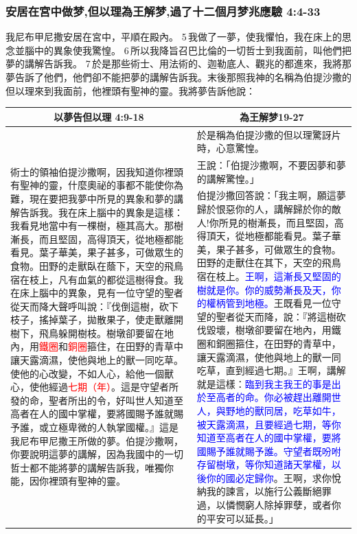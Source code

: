 \subsubsection{安居在宮中做梦,但以理為王解梦,過了十二個月梦兆應驗 4:4-33}
我尼布甲尼撒安居在宮中，平順在殿內。 5 我做了一夢，使我懼怕，我在床上的思念並腦中的異象使我驚惶。 6 所以我降旨召巴比倫的一切哲士到我面前，叫他們把夢的講解告訴我。 7 於是那些術士、用法術的、迦勒底人、觀兆的都進來，我將那夢告訴了他們，他們卻不能把夢的講解告訴我。末後那照我神的名稱為伯提沙撒的但以理來到我面前，他裡頭有聖神的靈。我將夢告訴他說：
\begin{table}[H]
\centering
\begin{tabular}{p{8.5cm}|p{8.750cm}}\hline\hline
\multicolumn{1}{c|}{以夢告但以理 4:9-18}&\multicolumn{1}{c}{為王解梦19-27}\\\hline
\multirow{3}{8.8cm}{術士的領袖伯提沙撒啊，因我知道你裡頭有聖神的靈，什麼奧祕的事都不能使你為難，現在要把我夢中所見的異象和夢的講解告訴我。我在床上腦中的異象是這樣：我看見地當中有一棵樹，極其高大。那樹漸長，而且堅固，高得頂天，從地極都能看見。葉子華美，果子甚多，可做眾生的食物。田野的走獸臥在蔭下，天空的飛鳥宿在枝上，凡有血氣的都從這樹得食。我在床上腦中的異象，見有一位守望的聖者從天而降大聲呼叫說：『伐倒這樹，砍下枝子，搖掉葉子，拋散果子，使走獸離開樹下，飛鳥躲開樹枝。樹墩卻要留在地內，用\textcolor{red}{鐵圈}和\textcolor{red}{銅圈}箍住，在田野的青草中讓天露滴濕，使他與地上的獸一同吃草。使他的心改變，不如人心，給他一個獸心，使他經過\textcolor{red}{七期（年）}。這是守望者所發的命，聖者所出的令，好叫世人知道至高者在人的國中掌權，要將國賜予誰就賜予誰，或立極卑微的人執掌國權。』這是我尼布甲尼撒王所做的夢。伯提沙撒啊，你要說明這夢的講解，因為我國中的一切哲士都不能將夢的講解告訴我，唯獨你能，因你裡頭有聖神的靈。}
&於是稱為伯提沙撒的但以理驚訝片時，心意驚惶。\\\cline{2-2}
&王說：「伯提沙撒啊，不要因夢和夢的講解驚惶。」\\\cline{2-2}
&伯提沙撒回答說：「我主啊，願這夢歸於恨惡你的人，講解歸於你的敵人!你所見的樹漸長，而且堅固，高得頂天，從地極都能看見。葉子華美，果子甚多，可做眾生的食物。田野的走獸住在其下，天空的飛鳥宿在枝上。\textcolor{blue}{王啊，這漸長又堅固的樹就是你。你的威勢漸長及天，你的權柄管到地極。}王既看見一位守望的聖者從天而降，說：『將這樹砍伐毀壞，樹墩卻要留在地內，用鐵圈和銅圈箍住，在田野的青草中，讓天露滴濕，使他與地上的獸一同吃草，直到經過七期。』王啊，講解就是這樣：\textcolor{blue}{臨到我主我王的事是出於至高者的命。你必被趕出離開世人，與野地的獸同居，吃草如牛，被天露滴濕，且要經過七期，等你知道至高者在人的國中掌權，要將國賜予誰就賜予誰。守望者既吩咐存留樹墩，等你知道諸天掌權，以後你的國必定歸你}。王啊，求你悅納我的諫言，以施行公義斷絕罪過，以憐憫窮人除掉罪孽，或者你的平安可以延長。」\\\hline
\end{tabular}
\end{table}
